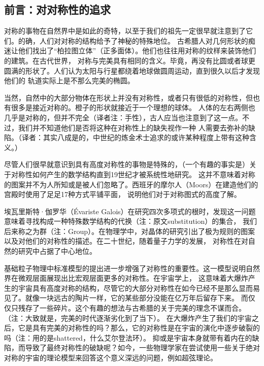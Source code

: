 \documentclass[UTF8]{book}
\begin{document}
\let\cleardoublepage\clearpage
\begin{center}
\chapter{前言：对对称性的追求}
\end{center}

对称的事物在自然界中是如此的奇特，以至于我们的祖先一定很早就注意到了它们。的确，人们对对称的结构给予了神秘的特殊地位。
古希腊人对几何形状的痴迷让他们找出了“柏拉图立体”（正多面体）。他们也往往用对称的纹样来装饰他们的建筑。在古代世界，
对称与完美具有相同的含义。毕竟，再没有比圆或者球更圆满的形状了。人们认为太阳与行星都绕着地球做圆周运动，直到很久以后才发现他们的
轨道实际上是不那么完美的椭圆。

当然，自然中的大部分物体在形状上并没有对称性，或者只有很低的对称性，但也有很多是接近对称的。橙子的形状就接近于一个理想的球体。
人体的左右两侧也几乎是对称的，但并不完全（译者注：手性），古人应当也注意到了这一点。不过，我们并不知道他们是否将这种在对称性上的缺失视作一种
人需要去弥补的缺陷。（译者：其实八成是的，中世纪的炼金术士追求的或许某种程度上带有这种含义。）

尽管人们很早就意识到具有高度对称性的事物是特殊的，（一个有趣的事实是）关于对称性如何产生的数学结构直到19世纪才被系统性地研究。
这并不意味着对称的图案并不为人所知或是被人们忽略了。西班牙的摩尔人（Moors）在建造他们的宫殿时使用了足足17种方式平铺平面，
说明他们对于对称图式的高度了解。


埃瓦里斯特·伽罗华（Évariste Galois）在研究四次多项式的根时，发现这一问题意味着寻找构成一种特殊数学结构的代换（注：原文substitution）的集合，
我们后来称之为群（注：Group）。在物理学中，对晶体的研究引出了极为规则的图案以及对他们的对称性的描述。在二十世纪，随着量子力学的发展，
对称性在对自然的研究中占据了中心地位。

基础粒子物理中标准模型的提出进一步增强了对称性的重要性。这一模型说明自然界在微观层面展现出比宏观层面更多的对称性。在宇宙学上，
这意味着大爆炸产生的宇宙具有高度对称的结构，尽管它的大部分对称性在如今已经不是那么显而易见了。就像一块远古的陶片一样，它的某些部分没能在亿万年后留存下来。
而仅仅只残存了一些碎片。这个有趣的想法与古希腊的关于完美的理念不谋而合。（注：大致就是，完美的时代逐渐劣化到了当下）。
在大爆炸产生了我们的宇宙之后，它是具有完美的对称性的吗？那么，它的对称性是在宇宙的演化中逐步破裂的吗（注：用的是shattered，什么艾尔登法环）。
抑或是宇宙本身就带有着内在的缺陷，而导致了最终对称性的破缺呢？如今，一些物理学家在尝试使用一些关于绝对对称的宇宙的理论模型来回答这个意义深远的问题，例如超弦理论。
\end{document}
